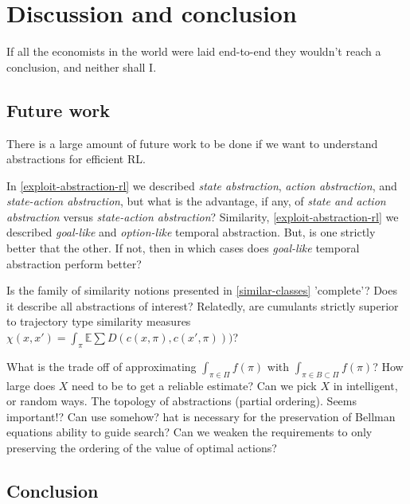 \chapter{Discussion and conclusion}\label{C:con}

If all the economists in the world were laid end-to-end they wouldn't
reach a conclusion, and neither shall I.


\section{Future work}

There is a large amount of future work to be done if we want to understand abstractions for efficient RL.

In \ref{exploit-abstraction-rl} we described \textit{state abstraction}, \textit{action abstraction}, and \textit{state-action abstraction}, but what is the advantage, if any, of \textit{state and action abstraction} versus \textit{state-action abstraction}? Similarity, \ref{exploit-abstraction-rl} we described \textit{goal-like} and \textit{option-like} temporal abstraction. But, is one strictly better that the other. If not, then in which cases does \textit{goal-like} temporal abstraction perform better?

Is the family of similarity notions presented in \ref{similar-classes} 'complete'? Does it describe all abstractions of interest?
Relatedly, are cumulants strictly superior to trajectory type similarity measures $\chi(x, x') = \int_\pi \mathbb E \sum D(c(x, \pi), c(x', \pi)))$?

What is the trade off of approximating $\int_{\pi \in \Pi}f(\pi)$ with $\int_{\pi \in B \subset \Pi}f(\pi)$?
How large does $X$ need to be to get a reliable estimate? Can we pick $X$ in intelligent, or random ways.
The topology of abstractions (partial ordering). Seems important!? Can use somehow?
hat is necessary for the preservation of Bellman equations ability to guide search? Can we weaken the requirements to only preserving the ordering of the value of optimal actions?



\section{Conclusion}
